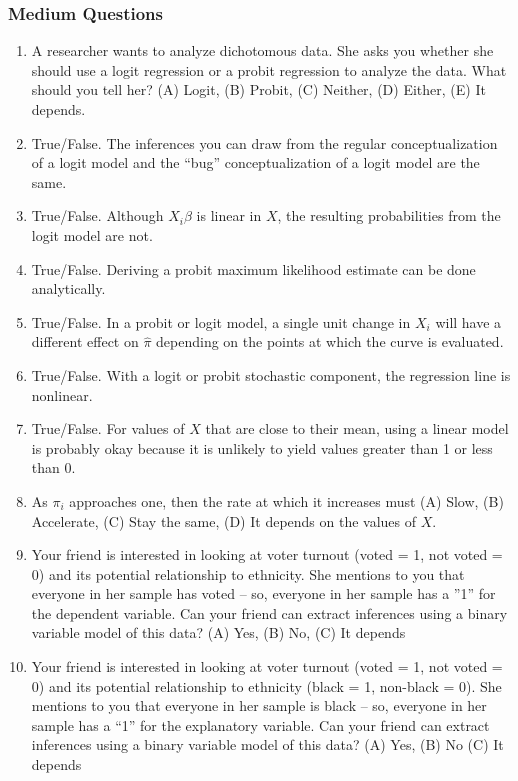 \documentclass[11pt]{article}
\begin{document}
\subsubsection{Medium Questions}

\begin{enumerate}
\item A researcher wants to analyze dichotomous data. She asks you whether she should use a logit regression or a probit regression to analyze the data. What should you tell her? (A) Logit, (B) Probit, (C) Neither, (D) Either, (E) It depends. 
\item True/False.  The inferences you can draw from the regular conceptualization of a logit model and the ``bug'' conceptualization of a logit model are the same. 
\item True/False.  Although $X_i\beta$ is linear in $X$, the resulting probabilities from the logit model are not.
\item True/False.  Deriving a probit maximum likelihood estimate can be done analytically.
\item True/False. In a probit or logit model, a single unit change in $X_i$ will have a different effect on $\hat{\pi}$ depending on the points at which the curve is evaluated. 
\item True/False. With a logit or probit stochastic component, the regression line is nonlinear. 
\item True/False. For values of $X$ that are close to their mean, using a linear model is probably okay because it is unlikely to yield values greater than 1 or less than 0. 
\item As $\pi_i$ approaches one, then the rate at which it increases must (A) Slow, (B) Accelerate, (C) Stay the same, (D) It depends on the values of $X$. 
\item Your friend is interested in looking at voter turnout (voted = 1, not voted = 0) and its potential relationship to ethnicity.  She mentions to you that everyone in her sample has voted -- so, everyone in her sample has a ''1'' for the dependent variable. Can your friend can extract inferences using a binary variable model of this data? (A) Yes, (B) No, (C) It depends 
\item Your friend is interested in looking at voter turnout (voted = 1, not voted = 0) and its potential relationship to ethnicity (black = 1, non-black = 0).  She mentions to you that everyone in her sample is black -- so, everyone in her sample has a ``1'' for the explanatory variable. Can your friend can extract inferences using a binary variable model of this data? (A) Yes, (B) No (C) It depends 

\end{enumerate}
\end{document}
